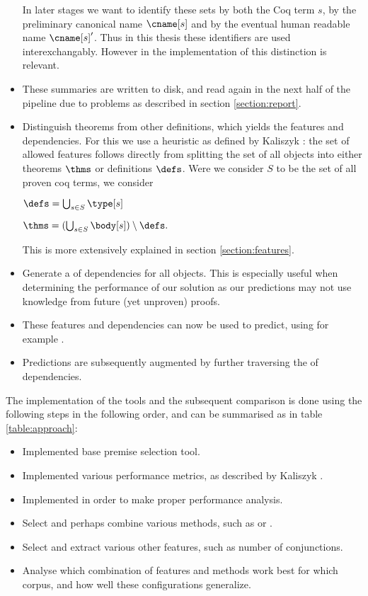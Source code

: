 \begin{itemize}
		In later stages we want to identify these sets by both the Coq term $s$, by the preliminary canonical name $\cname[s]$ and by the eventual human
		readable name $\cname[s]'$.
		Thus in this thesis these identifiers are used interexchangably.
		However in the implementation of \roerei this distinction is relevant.
	\item These summaries are written to disk, and read again in the next half of the pipeline due to problems as described in section \ref{section:report}.
	\item Distinguish theorems from other definitions, which yields the features and dependencies.
		For this we use a heuristic as defined by Kaliszyk \cite{kaliszyk2014machine}:
		the set of allowed features follows directly from splitting the set of all objects into either theorems $\thms$ or definitions $\defs$.
		Were we consider $S$ to be the set of all proven coq terms, we consider
		\begin{definition}  %
			$\defs = \bigcup_{s \in S} \type[s]$
		\end{definition}
		\begin{definition}
			$\thms = (\bigcup_{s \in S} \body[s]) \setminus \defs \text{.}$
		\end{definition}
		This is more extensively explained in section \ref{section:features}.
    \item Generate a \dagraph of dependencies for all \coq objects.
		This is especially useful when determining the performance of our solution as our predictions may not use
		knowledge from future (yet unproven) proofs.
	\item These features and dependencies can now be used to predict, using for example \knn.
	\item Predictions are subsequently augmented by further traversing the \dagraph of dependencies.
\end{itemize}

The implementation of the tools and the subsequent comparison is done using the following steps in the following order, and can be summarised as in table \ref{table:approach}:
\begin{itemize}
	\item Implemented base premise selection tool.
	\item Implemented various performance metrics, as described by Kaliszyk \cite{kaliszyk2014machine}.
	\item Implemented \crossvalidation in order to make proper performance analysis.
    \item Select and perhaps combine various \machinelearning methods, such as \nb or \ensemble.
	\item Select and extract various other features, such as number of conjunctions.
    \item Analyse which combination of features and \machinelearning methods work best for which corpus, and how well these configurations generalize.
\end{itemize}

